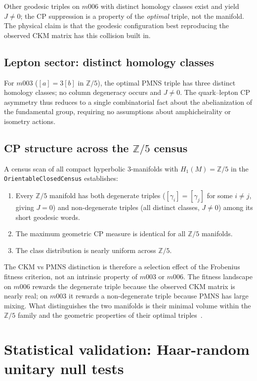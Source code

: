 ﻿\documentclass[12pt]{article}
\theoremstyle{definition}
\begin{document}
Other geodesic triples on $m006$ with distinct homology classes exist
and yield $J\neq 0$; the CP suppression is a property of the
\emph{optimal} triple, not the manifold.
The physical claim is that the geodesic configuration best reproducing
the observed CKM matrix has this collision built in.

\subsection{Lepton sector: distinct homology classes}

For $m003$ ($[a]=3[b]$ in $\mathbb{Z}/5$), the optimal PMNS triple
has three distinct homology classes; no column degeneracy occurs
and $J\neq 0$.
The quark--lepton CP asymmetry thus reduces to a single combinatorial
fact about the abelianization of the fundamental group, requiring
no assumptions about amphicheirality or isometry actions.


\subsection{CP structure across the $\mathbb{Z}/5$ census}
\label{subsec:z5_census}

A census scan of all compact hyperbolic 3-manifolds with $H_1(M)=\mathbb{Z}/5$ in the \texttt{OrientableClosedCensus} establishes:
\begin{enumerate}
\item Every $\mathbb{Z}/5$ manifold has both degenerate triples
($[\gamma_i]=[\gamma_j]$ for some $i\neq j$, giving $J=0$) and
non-degenerate triples (all distinct classes, $J\neq 0$) among its short geodesic words.
\item The maximum geometric CP measure is identical for all $\mathbb{Z}/5$ manifolds.
\item The class distribution is nearly uniform across $\mathbb{Z}/5$.
\end{enumerate}

The CKM vs PMNS distinction is therefore a selection effect of the Frobenius fitness criterion, not an intrinsic property of $m003$ or $m006$. The fitness landscape on $m006$ rewards the degenerate triple because the observed CKM matrix is nearly real; on $m003$ it rewards a non-degenerate triple because PMNS has large mixing. What distinguishes the two manifolds is their minimal volume within the $\mathbb{Z}/5$ family and the geometric properties of their optimal triples~\cite{Gentry:Scan}.
\section{Statistical validation: Haar-random unitary null tests}
\label{sec:haar}
\end{document}
